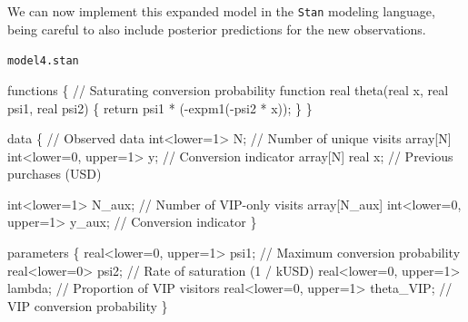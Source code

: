 \documentclass[
  letterpaper,
  DIV=11,
  numbers=noendperiod]{scrartcl}
\newenvironment{Shaded}{\begin{snugshade}}{\end{snugshade}}
\newcommand{\CommentTok}[1]{\textcolor[rgb]{0.37,0.37,0.37}{#1}}
\newcommand{\ControlFlowTok}[1]{\textcolor[rgb]{0.00,0.23,0.31}{#1}}
\newcommand{\DataTypeTok}[1]{\textcolor[rgb]{0.68,0.00,0.00}{#1}}
\newcommand{\DecValTok}[1]{\textcolor[rgb]{0.68,0.00,0.00}{#1}}
\newcommand{\KeywordTok}[1]{\textcolor[rgb]{0.00,0.23,0.31}{#1}}
\newcommand{\NormalTok}[1]{\textcolor[rgb]{0.00,0.23,0.31}{#1}}
\begin{document}
We can now implement this expanded model in the \texttt{Stan} modeling
language, being careful to also include posterior predictions for the
new observations.

\begin{codelisting}

\caption{\texttt{model4.stan}}

\begin{Shaded}
\begin{Highlighting}[]
\KeywordTok{functions}\NormalTok{ \{}
  \CommentTok{// Saturating conversion probability function}
  \DataTypeTok{real}\NormalTok{ theta(}\DataTypeTok{real}\NormalTok{ x, }\DataTypeTok{real}\NormalTok{ psi1, }\DataTypeTok{real}\NormalTok{ psi2) \{}
    \ControlFlowTok{return}\NormalTok{ psi1 * ({-}expm1({-}psi2 * x));}
\NormalTok{  \}}
\NormalTok{\}}

\KeywordTok{data}\NormalTok{ \{}
  \CommentTok{// Observed data}
  \DataTypeTok{int}\NormalTok{\textless{}}\KeywordTok{lower}\NormalTok{=}\DecValTok{1}\NormalTok{\textgreater{} N;                    }\CommentTok{// Number of unique visits}
  \DataTypeTok{array}\NormalTok{[N] }\DataTypeTok{int}\NormalTok{\textless{}}\KeywordTok{lower}\NormalTok{=}\DecValTok{0}\NormalTok{, }\KeywordTok{upper}\NormalTok{=}\DecValTok{1}\NormalTok{\textgreater{} y;  }\CommentTok{// Conversion indicator}
  \DataTypeTok{array}\NormalTok{[N] }\DataTypeTok{real}\NormalTok{ x;                   }\CommentTok{// Previous purchases (USD)}

  \DataTypeTok{int}\NormalTok{\textless{}}\KeywordTok{lower}\NormalTok{=}\DecValTok{1}\NormalTok{\textgreater{} N\_aux;                       }\CommentTok{// Number of VIP{-}only visits}
  \DataTypeTok{array}\NormalTok{[N\_aux] }\DataTypeTok{int}\NormalTok{\textless{}}\KeywordTok{lower}\NormalTok{=}\DecValTok{0}\NormalTok{, }\KeywordTok{upper}\NormalTok{=}\DecValTok{1}\NormalTok{\textgreater{} y\_aux; }\CommentTok{// Conversion indicator}
\NormalTok{\}}

\KeywordTok{parameters}\NormalTok{ \{}
  \DataTypeTok{real}\NormalTok{\textless{}}\KeywordTok{lower}\NormalTok{=}\DecValTok{0}\NormalTok{, }\KeywordTok{upper}\NormalTok{=}\DecValTok{1}\NormalTok{\textgreater{} psi1;      }\CommentTok{// Maximum conversion probability}
  \DataTypeTok{real}\NormalTok{\textless{}}\KeywordTok{lower}\NormalTok{=}\DecValTok{0}\NormalTok{\textgreater{} psi2;               }\CommentTok{// Rate of saturation (1 / kUSD)}
  \DataTypeTok{real}\NormalTok{\textless{}}\KeywordTok{lower}\NormalTok{=}\DecValTok{0}\NormalTok{, }\KeywordTok{upper}\NormalTok{=}\DecValTok{1}\NormalTok{\textgreater{} lambda;    }\CommentTok{// Proportion of VIP visitors}
  \DataTypeTok{real}\NormalTok{\textless{}}\KeywordTok{lower}\NormalTok{=}\DecValTok{0}\NormalTok{, }\KeywordTok{upper}\NormalTok{=}\DecValTok{1}\NormalTok{\textgreater{} theta\_VIP; }\CommentTok{// VIP conversion probability}
\NormalTok{\}}


\end{Highlighting}
\end{Shaded}
\end{codelisting}
\end{document}
